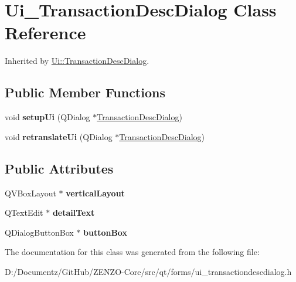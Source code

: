 \hypertarget{class_ui___transaction_desc_dialog}{}\section{Ui\+\_\+\+Transaction\+Desc\+Dialog Class Reference}
\label{class_ui___transaction_desc_dialog}


Inherited by \mbox{\hyperlink{class_ui_1_1_transaction_desc_dialog}{Ui\+::\+Transaction\+Desc\+Dialog}}.

\subsection*{Public Member Functions}
\begin{DoxyCompactItemize}
\item 
\mbox{\label{class_ui___transaction_desc_dialog_a6027533efeadcaadee6df13bc1f32a50}} 
void {\bfseries setup\+Ui} (Q\+Dialog $\ast$\mbox{\hyperlink{class_transaction_desc_dialog}{Transaction\+Desc\+Dialog}})
\item 
\mbox{\label{class_ui___transaction_desc_dialog_a86e31bdb827295e01cf0809405053ee9}} 
void {\bfseries retranslate\+Ui} (Q\+Dialog $\ast$\mbox{\hyperlink{class_transaction_desc_dialog}{Transaction\+Desc\+Dialog}})
\end{DoxyCompactItemize}
\subsection*{Public Attributes}
\begin{DoxyCompactItemize}
\item 
\mbox{\label{class_ui___transaction_desc_dialog_a1f24f76d872f97df7fc9b50e9d66b29a}} 
Q\+V\+Box\+Layout $\ast$ {\bfseries vertical\+Layout}
\item 
\mbox{\label{class_ui___transaction_desc_dialog_a44ab555fee5e6842ca1bd76d6c4d0779}} 
Q\+Text\+Edit $\ast$ {\bfseries detail\+Text}
\item 
\mbox{\label{class_ui___transaction_desc_dialog_a8d7e10291682e01bb7a811b233c5f4c5}} 
Q\+Dialog\+Button\+Box $\ast$ {\bfseries button\+Box}
\end{DoxyCompactItemize}


The documentation for this class was generated from the following file\+:\begin{DoxyCompactItemize}
\item 
D\+:/\+Documentz/\+Git\+Hub/\+Z\+E\+N\+Z\+O-\/\+Core/src/qt/forms/ui\+\_\+transactiondescdialog.\+h\end{DoxyCompactItemize}
